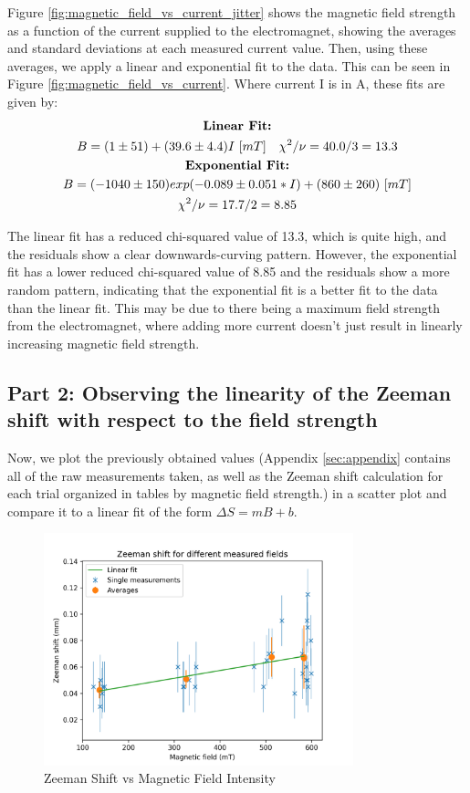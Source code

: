 Figure \ref{fig:magnetic_field_vs_current_jitter} shows the magnetic field strength as a function of the current supplied to the electromagnet, showing the averages and standard deviations at each measured current value. Then, using these averages, we apply a linear and exponential fit to the data. This can be seen in Figure \ref{fig:magnetic_field_vs_current}. Where current I is in A, these fits are given by:
\begin{gather*}
    \text{\textbf{Linear Fit:}} \\
    B = (1 \pm 51) + (39.6 \pm 4.4)I~[mT] \quad \chi^2 / \nu = 40.0 / 3 = 13.3 \\
    \text{\textbf{Exponential Fit:}} \\
    B = (-1040 \pm 150) exp (-0.089 \pm 0.051 * I) + (860 \pm 260)~[mT] \\
    \chi^2 / \nu = 17.7 / 2 = 8.85
\end{gather*}


The linear fit has a reduced chi-squared value of 13.3, which is quite high, and the residuals show a clear downwards-curving pattern. However, the exponential fit has a lower reduced chi-squared value of 8.85 and the residuals show a more random pattern, indicating that the exponential fit is a better fit to the data than the linear fit. This may be due to there being a maximum field strength from the electromagnet, where adding more current doesn't just result in linearly increasing magnetic field strength.

\subsection{Part 2: Observing the linearity of the Zeeman shift with respect to the field strength}

Now, we plot the previously obtained values (Appendix \ref{sec:appendix} contains all of the raw measurements taken, as well as the Zeeman shift calculation for each trial organized in tables by magnetic field strength.)
in a scatter plot and compare it to a linear fit of the form $\Delta S = mB + b$.

\begin{figure}
    \centering
    \includegraphics[width=0.8\textwidth]{Results/img/zeeman_shift_scatter.png}
    \caption{Zeeman Shift vs Magnetic Field Intensity}
    \label{fig:zeeman_shift_scatter}
\end{figure}

